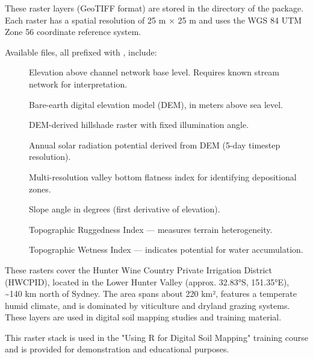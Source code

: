 \documentclass[a4paper]{book}
\begin{document}
\begin{Format}
These raster layers (GeoTIFF format) are stored in the  directory of the package. Each raster has a spatial resolution of 25 m × 25 m and uses the WGS 84 UTM Zone 56 coordinate reference system.

Available files, all prefixed with , include:

\begin{description}

\item[] Elevation above channel network base level. Requires known stream network for interpretation.
\item[] Bare-earth digital elevation model (DEM), in meters above sea level.
\item[] DEM-derived hillshade raster with fixed illumination angle.
\item[] Annual solar radiation potential derived from DEM (5-day timestep resolution).
\item[] Multi-resolution valley bottom flatness index for identifying depositional zones.
\item[] Slope angle in degrees (first derivative of elevation).
\item[] Topographic Ruggedness Index — measures terrain heterogeneity.
\item[] Topographic Wetness Index — indicates potential for water accumulation.

\end{description}

\end{Format}
%
\begin{Details}
These rasters cover the Hunter Wine Country Private Irrigation District (HWCPID), located in the Lower Hunter Valley (approx. 32.83°S, 151.35°E), \textasciitilde{}140 km north of Sydney. The area spans about 220 km², features a temperate humid climate, and is dominated by viticulture and dryland grazing systems. These layers are used in digital soil mapping studies and training material.
\end{Details}
%
\begin{Note}
This raster stack is used in the "Using R for Digital Soil Mapping" training course and is provided for demonstration and educational purposes.
\end{Note}
\end{document}
